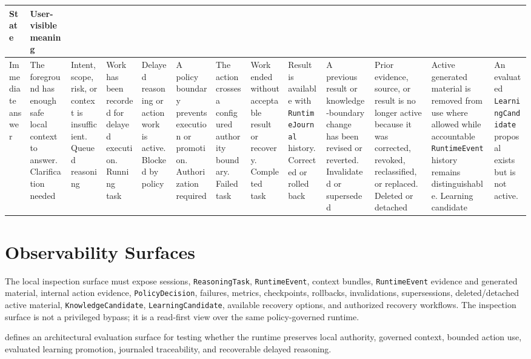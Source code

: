 \documentclass[11pt]{report}
\begin{document}
\begin{tabularx}{.95\linewidth}{@{}lX@{}}
	\toprule
	\textbf{State} & \textbf{User-visible meaning} \\
	\midrule
	Immediate answer & The foreground has enough safe local context to answer. \N
	Clarification needed & Intent, scope, risk, or context is insufficient. \N
	Queued reasoning & Work has been recorded for delayed execution. \N
	Running task & Delayed reasoning or action work is active. \N
	Blocked by policy & A policy boundary prevents execution or promotion. \N
	Authorization required & The action crosses a configured authority boundary. \N
	Failed task & Work ended without acceptable result or recovery. \N
	Completed task & Result is available with \texttt{RuntimeJournal} history. \N
	Corrected or rolled back & A previous result or knowledge-boundary change
	has been revised or reverted. \N
	Invalidated or superseded & Prior evidence, source, or result is no longer
	active because it was corrected, revoked, reclassified, or replaced. \N
	Deleted or detached & Active generated material is removed from use where
	allowed while accountable \texttt{RuntimeEvent} history remains distinguishable. \N
	Learning candidate & An evaluated \texttt{LearningCandidate} proposal exists but is not active. \\
	\bottomrule
\end{tabularx}

\section{Observability Surfaces}

The local inspection surface must expose sessions, \texttt{ReasoningTask}, \texttt{RuntimeEvent}, context bundles, \texttt{RuntimeEvent} evidence and generated material, internal action evidence, \texttt{PolicyDecision}, failures, metrics, checkpoints, rollbacks, invalidations, supersessions, deleted/detached active material, \texttt{KnowledgeCandidate}, \texttt{LearningCandidate}, available recovery options, and authorized recovery workflows. The inspection surface is not a privileged bypass; it is a read-first view over the same policy-governed runtime.


\Madre defines an architectural evaluation surface for testing whether the runtime preserves local authority, governed context, bounded action use, evaluated learning promotion, journaled traceability, and recoverable delayed reasoning.
\end{document}
